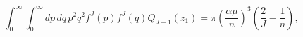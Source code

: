 \begin{equation}
\int_{0}^{\infty }\int_{0}^{\infty
}dp\,dq\,p^{2}q^{2}f^{J}(p)f^{J}(q)Q_{J-1}(z_{1})=\pi \left( \frac{\alpha
\mu }{n}\right) ^{3}\left( \frac{2}{J}-\frac{1}{n}\right) ,
\end{equation}

